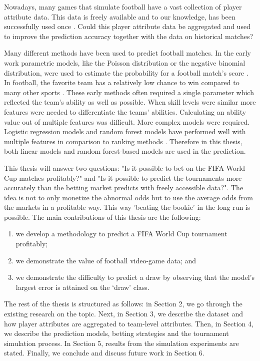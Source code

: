 Nowadays,  many games that simulate football have a vast collection of player attribute data. This data is freely available and to our knowledge, has been successfully used once \cite{shin2014novel}. Could this player attribute data be aggregated and used to improve the prediction accuracy together with the data on historical matches?

Many different methods have been used to predict football matches. In the early work parametric models, like the Poisson distribution or the negative binomial distribution, were used to estimate the probability for a football match's score \cite{moroney1962facts, dixon1997}. In football, the favorite team has a relatively low chance to win compared to many other sports \cite{anderson2013numbers}. These early methods often required a single parameter which reflected the team's ability as well as possible. When skill levels were similar more features were needed to differentiate the teams' abilities. Calculating an ability value out of multiple features was difficult. More complex models were required. Logistic regression models and random forest models have performed well with multiple features in comparison to ranking methods \cite{groll2018prediction, 10.1007/978-3-319-29504-6_48}. Therefore in this thesis, both linear models and random forest-based models are used in the prediction.

This thesis will answer two questions: "Is it possible to bet on the FIFA World Cup matches profitably?" and "Is it possible to predict the tournaments more accurately than the betting market predicts with freely accessible data?". The idea is not to only monetize the abnormal odds but to use the average odds from the markets in a profitable way. This way 'beating the bookie' in the long run is possible. The main contributions of this thesis are the following:
\begin{enumerate}
  \item we develop a methodology to predict a FIFA World Cup tournament profitably;
  \item we demonstrate the value of football video-game data; and
  \item we demonstrate the difficulty to predict a draw by observing that the model’s largest error is attained on the `draw’ class.
\end{enumerate}

The rest of the thesis is structured as follows: in Section 2, we go through the existing research on the topic. Next, in Section 3, we describe the dataset and how player attributes are aggregated to team-level attributes. Then, in Section 4, we describe the prediction models, betting strategies and the tournament simulation process. In Section 5, results from the simulation experiments are stated. Finally, we conclude and discuss future work in Section 6.